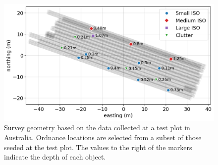 \begin{figure}[htb]
    \begin{center}
    \includegraphics[width=\columnwidth]{figures/synthetic-test-plot.png}
    \end{center}
\caption{
    Survey geometry based on the data collected at a test plot in Australia.
    Ordnance locations are selected from a subset of those seeded at the test plot.
    The values to the right of the markers indicate the depth of each object.
}
\label{fig:synthetic-test-plot}
\end{figure}

